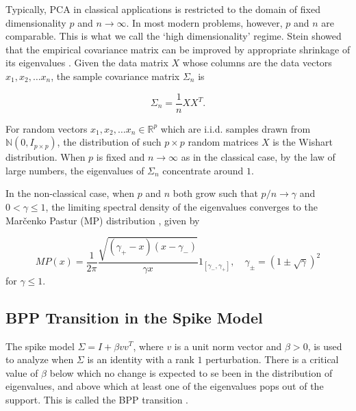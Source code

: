 Typically, PCA in classical applications is restricted to the domain of fixed dimensionality $p$ and $n \rightarrow \infty$. In most modern problems, however, $p$ and $n$ are comparable. This is what we call the `high dimensionality' regime. Stein showed that the empirical covariance matrix can be improved by appropriate shrinkage of its eigenvalues \cite{stein1956}. Given the data matrix $X$ whose columns are the data vectors $x_1, x_2, \ldots x_n$, the sample covariance matrix $\Sigma_n$ is

\begin{equation}
\Sigma_n=\frac{1}{n}XX^T.
\end{equation}

For random vectors $x_1, x_2, \ldots x_n \in \mathbb{R}^p$ which are i.i.d. samples drawn from $\mathbb{N}(0,I_{p \times p})$, the distribution of such $p \times p$ random matrices $X$ is the Wishart distribution. When $p$ is fixed and $n \rightarrow \infty$ as in the classical case, by the law of large numbers, the eigenvalues of $\Sigma_n$ concentrate around $1$.

In the non-classical case, when $p$ and $n$ both grow such that $p/n \rightarrow \gamma$ and $0<\gamma\leq 1$, the limiting spectral density of the eigenvalues converges to the Mar\v{c}enko Pastur (MP) distribution \cite{marcenko},
given by

\begin{equation}
MP(x) = \frac{1}{2\pi}\frac{\sqrt{(\gamma_+ - x)(x - \gamma_-)}}{\gamma x}1_{[\gamma_-,\gamma_+]}, \quad \gamma_{\pm} =(1 \pm \sqrt{\gamma})^2 
\end{equation}
for $\gamma \leq 1$.

\subsection{BPP Transition in the Spike Model}

The spike model $\Sigma=I+\beta vv^T$, where $v$ is a unit norm vector and $\beta>0$, is used to analyze when $\Sigma$ is an identity with a rank $1$ perturbation. There is a critical value of $\beta$ below which no change is expected to se been in the distribution of eigenvalues, and above which at least one of the eigenvalues pops out of the support. This is called the BPP transition \cite{bpp}.